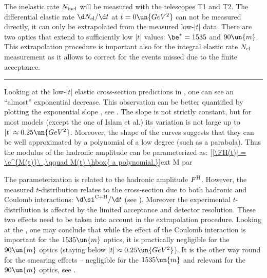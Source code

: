 The inelastic rate $N_{\rm inel}$ will be measured with the telescopes T1 and T2.
The differential elastic rate $\d N_{\rm el}/\d t$ at $t=0\un{GeV^2}$ can not be measured directly, it can only be extrapolated from the measured low-$|t|$ data. There are two optics that extend to sufficiently low $|t|$ values: $\be^* = 1535$ and $90\un{m}$. This extrapolation procedure is important also for the integral elastic rate $N_{\rm el}$ measurement as it allows to correct for the events missed due to the finite acceptance.

\vskip1cm\hrule

Looking at the low-$|t|$ elastic cross-section predictions in , one can see an ``almost'' exponential decrease. This observation can be better quantified by plotting the exponential slope , see . The slope is not strictly constant, but for most models (except the one of Islam et al.) its variation is not large up to $|t| \approx 0.25\un{GeV^2}$. Moreover, the shape of the curves suggests that they can be well approximated by a polynomial of a low degree (such as a parabola). Thus the modulus of the hadronic amplitude can be parameterized as:
\eqref{|\FH(t)| = \e^{M(t)}\ ,\qquad M(t) \hbox{ a polynomial.}}{ext M par}

The parameterization  is related to the hadronic amplitude $F^{\rm H}$. However, the measured $t$-distribution relates to the cross-section due to both hadronic and Coulomb interactions: $\d\si^{\rm C+H}/\d t$ (see ). Moreover the experimental $t$-distribution is affected by the limited acceptance and detector resolution. These two effects need to be taken into account in the extrapolation procedure. Looking at the , one may conclude that while the effect of the Coulomb interaction is important for the $1535\un{m}$ optics, it is practically negligible for the $90\un{m}$ optics (staying below $|t| \approx 0.25\un{GeV^2}$). It is the other way round for the smearing effects -- negligible for the $1535\un{m}$ and relevant for the $90\un{m}$ optics, see .

